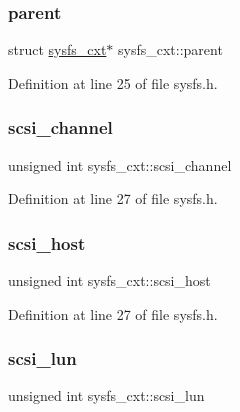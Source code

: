 \subsubsection{\texorpdfstring{parent}{parent}}
{\footnotesize\ttfamily struct \hyperlink{structsysfs__cxt}{sysfs\+\_\+cxt}$\ast$ sysfs\+\_\+cxt\+::parent}



Definition at line 25 of file sysfs.\+h.

\mbox{\label{structsysfs__cxt_a1e05f9b952073571e3549605511bca82}} 
\subsubsection{\texorpdfstring{scsi\+\_\+channel}{scsi\_channel}}
{\footnotesize\ttfamily unsigned int sysfs\+\_\+cxt\+::scsi\+\_\+channel}



Definition at line 27 of file sysfs.\+h.

\mbox{\label{structsysfs__cxt_ac1c78a0935261e3efca612863c7405c0}} 
\subsubsection{\texorpdfstring{scsi\+\_\+host}{scsi\_host}}
{\footnotesize\ttfamily unsigned int sysfs\+\_\+cxt\+::scsi\+\_\+host}



Definition at line 27 of file sysfs.\+h.

\mbox{\label{structsysfs__cxt_a33997ca225c5bbb239ce87424c8be581}} 
\subsubsection{\texorpdfstring{scsi\+\_\+lun}{scsi\_lun}}
{\footnotesize\ttfamily unsigned int sysfs\+\_\+cxt\+::scsi\+\_\+lun}



